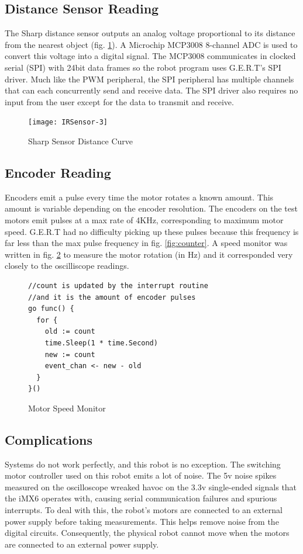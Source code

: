 \subsection{Distance Sensor Reading}
The Sharp distance sensor outputs an analog voltage proportional to its distance from the nearest object (fig. \ref{fig:curve}).
A Microchip MCP3008 8-channel ADC is used to convert this voltage into a digital signal. The MCP3008 communicates in clocked
serial (SPI) with 24bit data frames so the robot program uses G.E.R.T's SPI driver. Much like the
PWM peripheral, the SPI peripheral has multiple channels that can each concurrently send and receive data. The SPI
driver also requires no input from the user except for the data to transmit and receive.

\begin{figure}[h]
\begin{center}
  \texttt{[image: IRSensor-3]}
\end{center}
  \caption{Sharp Sensor Distance Curve} \label{fig:curve}
\end{figure}

\clearpage
\subsection{Encoder Reading}
Encoders emit a pulse every time the motor rotates a known amount. This amount is variable depending on the
encoder resolution. The encoders on the test motors emit pulses at a max rate of 4KHz, corresponding to
maximum motor speed. G.E.R.T had no difficulty picking up these pulses because this frequency is far less than
the max pulse frequency in fig. \ref{fig:counter}. A speed monitor was written in fig. \ref{fig:speedmon}
to measure the motor rotation (in Hz) and it corresponded very closely to the oscilliscope readings.

\begin{figure}[h]
\begin{center}
\begin{lstlisting}
//count is updated by the interrupt routine
//and it is the amount of encoder pulses
go func() {
  for {
    old := count
    time.Sleep(1 * time.Second)
    new := count
    event_chan <- new - old
  }
}()
\end{lstlisting}
\end{center}
  \caption{Motor Speed Monitor} \label{fig:speedmon}
\end{figure}

\subsection{Complications}
Systems do not work perfectly, and this robot is no exception. The switching motor controller used
on this robot emits a lot of noise. The 5v noise spikes measured on the oscilloscope wreaked havoc
on the 3.3v single-ended signals that the iMX6 operates with, causing serial communication failures
and spurious interrupts. To deal with this, the robot's motors are connected to an external power supply before
taking measurements. This helps remove noise from the digital circuits. Consequently, the physical
robot cannot move when the motors are connected to an external power supply.

